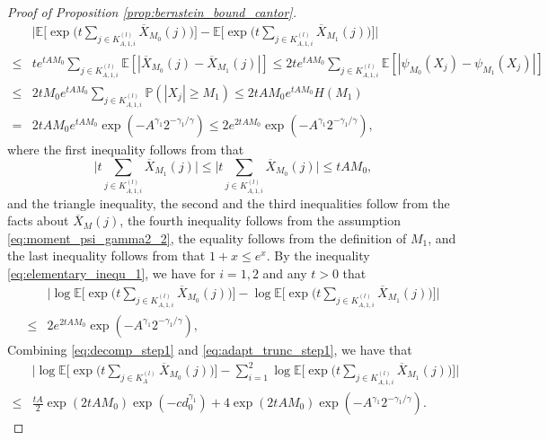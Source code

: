 \documentclass[11pt]{article}
\theoremstyle{plain}
\theoremstyle{definition}
\begin{document}
\begin{proof}[Proof of Proposition \ref{prop:bernstein_bound_cantor}]
\begin{equation*}
\begin{aligned}
        &\Big|\mathbb{E}\Big[\exp\Big( t\sum_{j \in K_{A,1,i}^{(l)}}\overline{X}_{M_0}(j) \Big)\Big] - \mathbb{E}\Big[\exp\Big( t\sum_{j \in K_{A,1,i}^{(l)}}\overline{X}_{M_1}(j) \Big)\Big]\Big|\\
        \leq& te^{tAM_0}\sum_{j \in K_{A,1,i}^{(l)}} \mathbb{E}[|\overline{X}_{M_0}(j)-\overline{X}_{M_1}(j)|] \leq 2te^{tAM_0}\sum_{j \in K_{A,1,i}^{(l)}} \mathbb{E}[|\psi_{M_0}(X_j) -\psi_{M_1}(X_j)|]\\
        \leq& 2tM_0e^{tAM_0}\sum_{j \in K_{A,1,i}^{(l)}} \mathbb{P}(|X_j| \geq M_1) \leq 2tAM_0e^{tAM_0}H(M_1)\\
        =& 2tAM_0e^{tAM_0}\exp(-A^{\gamma_1}2^{-\gamma_1/\gamma}) \leq 2e^{2tAM_0}\exp(-A^{\gamma_1}2^{-\gamma_1/\gamma}),
    \end{aligned}
    \end{equation*}
    where the first inequality follows from that 
    \begin{equation*}
        \Big|t\sum_{j \in K_{A,1,i}^{(l)}}\overline{X}_{M_1}(j)\Big| \leq \Big|t\sum_{j \in K_{A,1,i}^{(l)}}\overline{X}_{M_0}(j)\Big| \leq tAM_0,
    \end{equation*}
    and the triangle inequality, the second and the third inequalities follow from the facts about $\overline{X}_M(j)$, the fourth inequality follows from the assumption \eqref{eq:moment_psi_gamma2_2}, the equality follows from the definition of $M_1$, and the last inequality follows from that $1 + x \leq e^x$.
    By the inequality \eqref{eq:elementary_inequ_1}, we have for $i = 1,2$ and any $t > 0$ that
    \begin{equation}\label{eq:adapt_trunc_step1}
    \begin{aligned}
        &\Big|\log\mathbb{E}\Big[\exp\Big( t\sum_{j \in K_{A,1,i}^{(l)}}\overline{X}_{M_0}(j) \Big)\Big] - \log\mathbb{E}\Big[\exp\Big( t\sum_{j \in K_{A,1,i}^{(l)}}\overline{X}_{M_1}(j) \Big)\Big]\Big|\\
        \leq& 2e^{2tAM_0}\exp(-A^{\gamma_1}2^{-\gamma_1/\gamma}),
    \end{aligned}
    \end{equation}
    Combining \eqref{eq:decomp_step1} and \eqref{eq:adapt_trunc_step1}, we have that
    \begin{equation}\label{eq:together_step1}
    \begin{aligned}
        &\Big|\log\mathbb{E}\Big[\exp\Big(t\sum_{j \in K_{A}^{(l)}}\overline{X}_{M_0}(j)\Big)\Big] - \sum_{i=1}^2\log\mathbb{E}\Big[\exp\Big( t\sum_{j \in K_{A,1,i}^{(l)}}\overline{X}_{M_1}(j) \Big)\Big]\Big|\\
        \leq& \frac{tA}{2}\exp(2tAM_0)\exp(-cd_0^{\gamma_1}) + 4\exp(2tAM_0)\exp(-A^{\gamma_1}2^{-\gamma_1/\gamma}).
    \end{aligned}
    \end{equation}
    

\end{proof}
\end{document}
